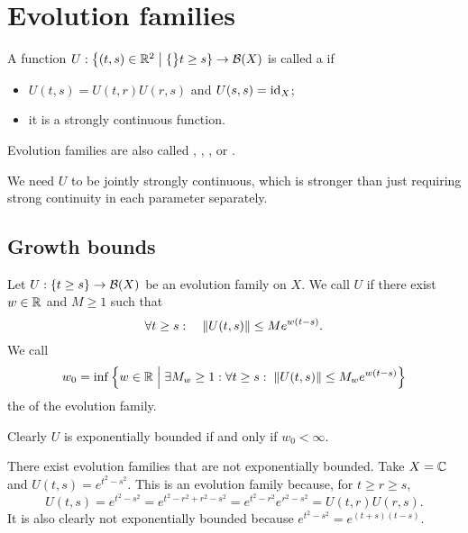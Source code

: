 \chapter{Evolution families}
\begin{definition}
A function $U: \setbuilder{(t,s)\in \R^2}\{t\geq s\}\to \Bounded(X)$ is called a  if
\begin{itemize}
\item $U(t,s) = U(t,r)U(r,s)$ and $U(s,s) = \operatorname{id}_X$;
\item it is a strongly continuous function.
\end{itemize}
Evolution families are also called , ,
,  or .
\end{definition}
We need $U$ to be jointly strongly continuous, which is stronger than just requiring strong continuity in each parameter separately.

\section{Growth bounds}
\begin{definition}
Let $U: \{t\geq s\}\to \operatorname{\mathcal{B}}(X)$ be an evolution family on $X$. We call $U$  if there exist $w\in\mathbb{R}$ and $M\geq 1$ such that
\[ \forall t\geq s:\quad \lVert U(t,s)\rVert \leq M e^{w(t-s)}. \]
We call
\[ w_0 = \inf\setbuilder{w\in \R}{\exists M_w \geq 1: \forall t\geq s:\; \norm{U(t,s)} \leq M_w e^{w(t-s)} } \]
the  of the evolution family.
\end{definition}
Clearly $U$ is exponentially bounded if and only if $w_0 < \infty$.

\begin{example}
There exist evolution families that are not exponentially bounded. Take $X = \mathbb{C}$ and $U(t,s) = e^{t^2 - s^2}$. This is an evolution family because, for $t\geq r\geq s$,
\[ U(t,s) = e^{t^2 - s^2} = e^{t^2 - r^2 + r^2 - s^2} = e^{t^2 - r^2}e^{r^2 - s^2} = U(t,r)U(r,s). \]
It is also clearly not exponentially bounded because $e^{t^2 - s^2} = e^{(t+s)(t-s)}$.
\end{example}

